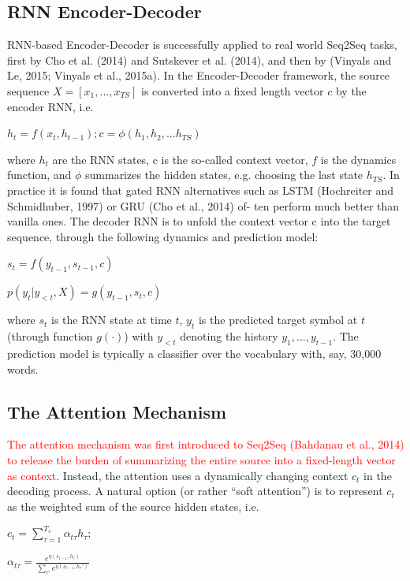 \documentclass[UTF8]{ctexart}
\begin{document}
    \subsection{RNN Encoder-Decoder}

    RNN-based Encoder-Decoder is successfully applied to real world Seq2Seq tasks, first by Cho et
    al. (2014) and Sutskever et al. (2014), and then
    by (Vinyals and Le, 2015; Vinyals et al., 2015a).
    In the Encoder-Decoder framework, the source sequence $X = [x_1, ..., x_{TS}]$ is converted into a fixed
    length vector $c$ by the encoder RNN, i.e.

    $ h_t =f(x_t,h_{t-1});c=\phi({h_1,h_2,...h_{TS}})$


    where ${h_t}$ are the RNN states, c is the so-called
    context vector, $f$ is the dynamics function, and $\phi$
    summarizes the hidden states, e.g. choosing the
    last state $h_{TS}$. In practice it is found that gated
    RNN alternatives such as LSTM (Hochreiter and
    Schmidhuber, 1997) or GRU (Cho et al., 2014) of-
    ten perform much better than vanilla ones.
    The decoder RNN is to unfold the context vector c into the target sequence, through the following dynamics and prediction model:
    
    $ s_t=f(y_{t-1},s_{t-1},c) $


    $ p(y_t|y_{<t},X)=g( y_{t-1}, s_t,c) $     


    where $s_t$ is the RNN state at time $t$, $y_t$ is the predicted target symbol at $t$ (through function $g(·)$)
    with $y_{<t}$ denoting the history ${y_1, ..., y_{t−1}}$. The prediction model is typically a classifier over the
    vocabulary with, say, 30,000 words.

    \subsection{The Attention Mechanism}
    \textcolor{red}{The attention mechanism was first introduced to Seq2Seq (Bahdanau et al., 2014) to release the
    burden of summarizing the entire source into a
    fixed-length vector as context}. Instead, the attention uses a dynamically changing context $c_t$ in the
    decoding process. A natural option (or rather “soft
    attention”) is to represent $c_t$ as the weighted sum
    of the source hidden states, i.e.

    $c_t=\sum_{\tau =1}^{T_s}  \alpha_{t \tau}h_\tau;$


    $\alpha_{t \tau}= \frac{e^{\eta(s_{t-1},h_\tau)}}{\sum_{\tau'}e^{ \eta(s_{t-1},h_\tau') } } $
\end{document}
